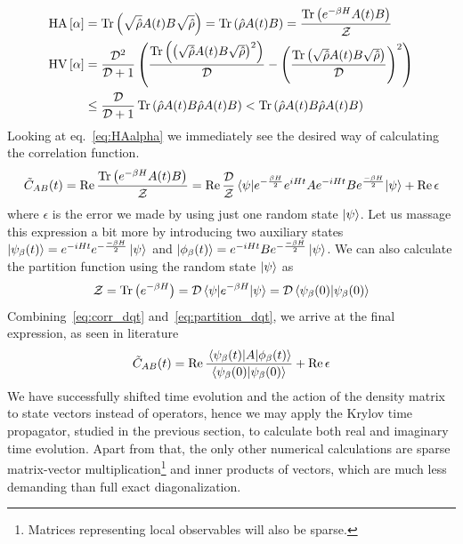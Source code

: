 \begin{align}
	\mathrm{HA}\left[\alpha\right] &= \Tr\left(\sqrt{\hat{\rho}}A(t)B\sqrt{\hat{\rho}}\right) = \Tr\left(\hat{\rho}A(t)B\right) = \frac{\Tr\left(e^{-\beta H}A(t)B\right)}{\mathcal{Z}} \label{eq:HAalpha}\\
	\mathrm{HV}\left[\alpha\right] &= \frac{\mathcal{D}^2}{\mathcal{D} + 1}\left(
		\frac{\Tr\left(\left(\sqrt{\hat{\rho}}A(t)B\sqrt{\hat{\rho}}\right)^2\right)}{\mathcal{D}} - \left(\frac{\Tr\left(\sqrt{\hat{\rho}}A(t)B\sqrt{\hat{\rho}}\right)}{\mathcal{D}}\right)^2
	\right) \nonumber\\
	&\leq \frac{\mathcal{D}}{\mathcal{D}+1} \Tr\left(\hat{\rho}A(t)B \hat{\rho}A(t)B\right) < \Tr\left(\hat{\rho}A(t)B \hat{\rho}A(t)B\right)
	\label{eq:HValpha}
\end{align}
Looking at eq.~\eqref{eq:HAalpha} we immediately see the desired way of calculating the correlation function.
\begin{equation}
	\tilde{C}_{AB}(t) = \Re \frac{\Tr\left(e^{-\beta H}A(t)B\right)}{\mathcal{Z}} = \Re \frac{\dimension}{\mathcal{Z}} 
	\matrixel{\psi}{e^{-\frac{\beta H}{2}} e^{i H t}A e^{-i H t} Be^{\frac{-\beta H}{2}}}{\psi} + \Re \epsilon
	\label{eq:corr_dqt}
\end{equation}
where \(\epsilon\) is the error we made by using just one random state \(\ket{\psi}\). 
Let us massage this expression a bit more by introducing two auxiliary states 
\(\ket{\psi_{\beta}(t)} = e^{-i H t} e^{-\frac{-\beta H}{2}} \ket{\psi} \) and
\(\ket{\phi_{\beta}(t)} = e^{-i H t} B e^{-\frac{-\beta H}{2}} \ket{\psi} \). We can also
calculate the partition function using the random state \(\ket{\psi}\) as
\begin{equation}
	\mathcal{Z} = \Tr\left(e^{-\beta H}\right) = \dimension \matrixel{\psi}{e^{-\beta H}}{\psi} = 
	\dimension \braket{\psi_{\beta}(0)}{\psi_{\beta}(0)}
	\label{eq:partition_dqt}
\end{equation}
Combining~\eqref{eq:corr_dqt} and~\eqref{eq:partition_dqt}, we arrive at the final expression, as seen in literature~\autocite{Steinigeweg2014,Steinigeweg2015,Richter2019}
\begin{equation}
	\tilde{C}_{AB}(t) = \Re \frac{\matrixel{\psi_{\beta}(t)}{A}{\phi_{\beta}(t)}}{\braket{\psi_{\beta}(0)}{\psi_{\beta}(0)}} + \Re \epsilon
	\label{eq:corr_dqt_final}
\end{equation}
We have successfully shifted time evolution and the action of the density matrix to state vectors instead of operators,
hence we may apply the Krylov time propagator, studied in the previous section, to calculate both real and imaginary time
evolution. Apart from that, the only other numerical calculations are sparse matrix-vector multiplication\footnote{Matrices representing local observables will also be sparse.}
and inner products of vectors, which are much less demanding than full exact diagonalization. 

